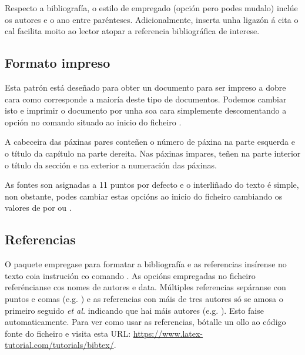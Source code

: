 Respecto a bibliografía, o estilo de empregado (opción  pero podes mudalo) inclúe os autores e o ano entre parénteses. Adicionalmente, inserta unha ligazón á cita o cal facilita moito ao lector atopar a referencia bibliográfica de interese. 


\subsection{Formato impreso}

Esta patrón está deseñado para obter un documento para ser impreso a dobre cara como corresponde a maioría deste tipo de documentos. Podemos cambiar isto e imprimir o documento por unha soa cara simplemente descomentando a opción  no comando  situado ao inicio do ficheiro . 

A cabeceira das páxinas pares conteñen o número de páxina na parte esquerda e o título da capítulo na parte dereita. Nas páxinas impares, teñen na parte interior o título da sección e na exterior a numeración das páxinas. 
 
As fontes son asignadas a 11 puntos por defecto e o interliñado do texto é simple, non obstante, podes cambiar estas opcións ao inicio do ficheiro  cambiando os valores de  por  ou .



\subsection{Referencias}

O paquete  empregase para formatar a bibliografía e as referencias insírense no texto coia instrución co comando \parencite{Reference1}. As opcións empregadas no ficheiro  referéncianse cos nomes de autores e data. Múltiples referencias sepáranse con puntos e comas (e.g. \parencite{Reference2, Reference1}) e as referencias con máis de tres autores só se amosa o primeiro seguido \emph{et al.} indicando que hai máis autores (e.g. \parencite{Reference3}). Esto faise automaticamente. Para ver como usar as referencias, bótalle un ollo ao código fonte do ficheiro  e visita esta URL: \url{https://www.latex-tutorial.com/tutorials/bibtex/}.


